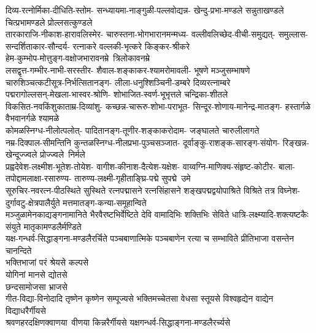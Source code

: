 \begin{multicols}{2}
\begin{flushleft}
\medskip
दिव्य-रत्नोर्मिका-दीधिति-स्तोम-
सन्ध्यायमा-नाङ्गुळी-पल्लवोद्यन्न-
खेन्दु-प्रभा-मण्डले सन्नुताखण्डले
चित्प्रभामण्डले प्रोल्लसत्कुण्डले\\
\medskip
तारकाराजि-नीकाश-हारावलिस्मेर-
चारुस्तना-भोगभारानमन्मध्य-
वल्लीवलिच्छेद-वीची-समुद्यत्-
समुल्लास-सन्दर्शिताकार-सौन्दर्य-
रत्नाकरे वल्लकी-भृत्करे किङ्कर-श्रीकरे\\
\medskip
हेम-कुम्भोप-मोत्तुङ्ग-वक्षोजभारावनम्रे~त्रिलोकावनम्रे\\
\medskip
लसद्वृत्त-गम्भीर-नाभी-सरस्तीर-
शैवाल-शङ्काकर-श्यामरोमावली-
भूषणे मञ्जुसम्भाषणे\\
\medskip
चारुशिञ्चत्कटीसूत्र-निर्भत्सितानङ्ग-
लीला-धनुश्शिञ्चिनी-डम्बरे दिव्यरत्नाम्बरे\\
\medskip
पद्मरागोल्लसन्-मेखला-भास्वर-श्रोणि-
शोभाजित-स्वर्ण-भूभृत्तले चन्द्रिका-शीतले\\
\medskip
विकसित-नवकिंशुकाताम्र-दिव्यांशु-
कच्छन्न-चारूरु-शोभा-पराभूत-
सिन्दूर-शोणाय-मानेन्द्र-मातङ्ग-
हस्तार्गळे वैभवानर्गळे श्यामळे\\
\medskip
कोमळस्निग्ध-नीलोत्पलोत्-
पादितानङ्ग-तूणीर-शङ्काकरोदाम-
जङ्घालते चारुलीलागते\\
\medskip
नम्र-दिक्पाल-सीमन्तिनि
कुन्तळस्निग्ध-नीलप्रभा-पुञ्चसञ्जात-
दूर्वाङ्कु-राशङ्क-सारङ्ग-संयोग-
रिङ्खन्न-खेन्दूज्ज्वले प्रोज्ज्वले~निर्मले\\
\medskip
प्रह्वदेवेश-लक्ष्मीश-भूतेश-तोयेश-
वागीश-कीनाश-दैत्येश-यक्षेश-
वाय्वग्नि-माणिक्य-संहृष्ट-कोटीर-
बाला-तपोद्दामलाक्षा-रसारुण्य-
तारुण्य-लक्ष्मी-गृहीताङ्घ्रि-पद्मे
सुपद्मे~उमे\\
\medskip
सूरुचिर-नवरत्न-पीठस्थिते सुस्थिते
रत्नपद्मासने रत्नसिंहासने 
शङ्खपद्मद्वयोपाश्रिते विश्रिते
तत्र विघ्नेश-दुर्गावटु-क्षेत्रपालैर्युते
मत्तमातङ्ग-कन्या-समूहान्विते\\
\medskip
मञ्जुळामेनकाद्यङ्गनामानिते
भैरवैरष्टभिर्वेष्टिते देवि 
वामादिभिः शक्तिभिः सेविते 
धात्रि-लक्ष्म्यादि-शक्त्यष्टकैः संयुते
मातृकामण्डलैर्मण्डिते\\
\medskip
यक्ष-गन्धर्व-सिद्धाङ्गना-मण्डलैरर्चिते
पञ्चबाणात्मिके पञ्चबाणेन रत्या च सम्भाविते
प्रीतिभाजा वसन्तेन चानन्दिते\\
\medskip
भक्तिभाजां परं श्रेयसे कल्पसे\\
योगिनां मानसे द्योतसे\\
छन्दसामोजसा भ्राजसे\\
गीत-विद्या-विनोदादि तृष्णेन कृष्णेन सम्पूज्यसे
भक्तिमच्चेतसा वेधसा स्तूयसे
विश्वहृद्येन वाद्येन विद्याधरैर्गीयसे\\
\medskip
श्रवणहरदक्षिणक्वाणया~वीणया 
किन्नरैर्गीयसे यक्षगन्धर्व-सिद्धाङ्गना-मण्डलैरर्च्यसे\\

\end{flushleft}
\end{multicols}
